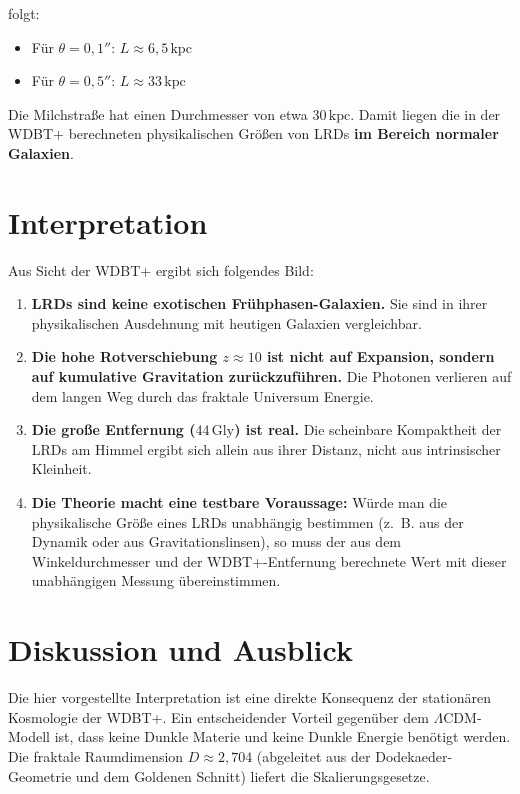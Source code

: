 \documentclass[12pt,a4paper]{article}
\begin{document}
folgt:

\begin{itemize}
\item Für $\theta = 0{,}1''$: $L \approx 6{,}5\,\text{kpc}$
\item Für $\theta = 0{,}5''$: $L \approx 33\,\text{kpc}$
\end{itemize}

Die Milchstraße hat einen Durchmesser von etwa $30\,\text{kpc}$. Damit liegen die in der WDBT+ berechneten physikalischen Größen von LRDs \textbf{im Bereich normaler Galaxien}.

\section{Interpretation}

Aus Sicht der WDBT+ ergibt sich folgendes Bild:

\begin{enumerate}
\item \textbf{LRDs sind keine exotischen Frühphasen-Galaxien.} Sie sind in ihrer physikalischen Ausdehnung mit heutigen Galaxien vergleichbar.
\item \textbf{Die hohe Rotverschiebung $z \approx 10$ ist nicht auf Expansion, sondern auf kumulative Gravitation zurückzuführen.} Die Photonen verlieren auf dem langen Weg durch das fraktale Universum Energie.
\item \textbf{Die große Entfernung ($44\,\text{Gly}$) ist real.} Die scheinbare Kompaktheit der LRDs am Himmel ergibt sich allein aus ihrer Distanz, nicht aus intrinsischer Kleinheit.
\item \textbf{Die Theorie macht eine testbare Voraussage:} Würde man die physikalische Größe eines LRDs unabhängig bestimmen (z.~B. aus der Dynamik oder aus Gravitationslinsen), so muss der aus dem Winkeldurchmesser und der WDBT+-Entfernung berechnete Wert mit dieser unabhängigen Messung übereinstimmen.
\end{enumerate}

\section{Diskussion und Ausblick}

Die hier vorgestellte Interpretation ist eine direkte Konsequenz der stationären Kosmologie der WDBT+. Ein entscheidender Vorteil gegenüber dem $\Lambda$CDM-Modell ist, dass keine Dunkle Materie und keine Dunkle Energie benötigt werden. Die fraktale Raumdimension $D \approx 2{,}704$ (abgeleitet aus der Dodekaeder-Geometrie und dem Goldenen Schnitt) liefert die Skalierungsgesetze.
\end{document}
